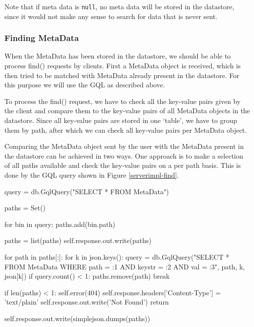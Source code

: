 Note that if meta data is \texttt{null}, no meta data will be stored in the
datastore, since it would not make any sense to search for data that is never
sent.

\subsubsection{Finding MetaData}
\label{serverimpl-findmd}
When the MetaData has been stored in the datastore, we should be able to process
find() requests by clients. First a MetaData object is received, which is then
tried to be matched with MetaData already present in the datastore. For this
purpose we will use the GQL as described above.

To process the find() request, we have to check all the key-value pairs given
by the client and compare them to the key-value pairs of all MetaData objects
in the datastore. Since all key-value pairs are stored in one `table', we
have to group them by path, after which we can check all key-value pairs per
MetaData object.

Comparing the MetaData object sent by the user with the MetaData present in the
datastore can be achieved in two ways. One approach is to make a selection of
all paths available and check the key-value pairs on a per path basis. This
is done by the GQL query shown in Figure \ref{serverimpl-find}.

\begin{figure*}[ht] %
\begin{center}
\begin{code}
query = db.GqlQuery("SELECT * FROM MetaData")

paths = Set()

for bin in query:
  paths.add(bin.path)
  
paths  = list(paths)
self.response.out.write(paths)

for path in paths[:]:
  for k in json.keys():
    query = db.GqlQuery("SELECT * FROM MetaData WHERE path = :1 AND keystr = :2
                         AND val = :3", path, k, json[k])
    if query.count() < 1:
      paths.remove(path)
      break

if len(paths) < 1:
  self.error(404)
  self.response.headers['Content-Type'] = 'text/plain'
  self.response.out.write('Not Found')
  return

self.response.out.write(simplejson.dumps(paths))  
\end{code}
\caption{Functionality of \texttt{find()} Function.\label{serverimpl-find}}
\end{center}
\end{figure*}

